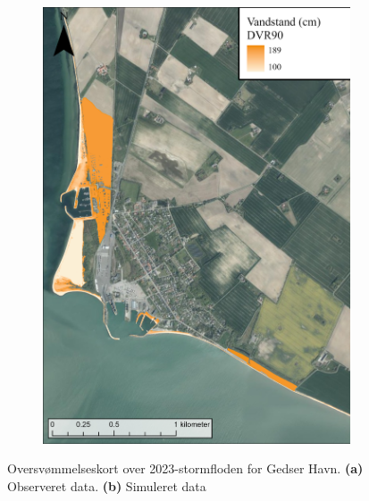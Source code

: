 \begin{figure}[H]
    \begin{subfigure}[t]{0.5\textwidth}
        \centering
        \includegraphics[width=0.95\linewidth]{images/Resultater/2023Model/2023 model_gedser.jpg}
        \caption{}
        \label{Subfig: Model Gedser}
    \end{subfigure}
    \caption{Oversvømmelseskort over 2023-stormfloden for Gedser Havn. \textbf{(a)} Observeret data. \textbf{(b)} Simuleret data}
    \label{Figur: Målt & simuleret Gedser}
\end{figure}

